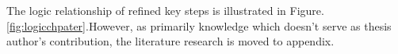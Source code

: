 The logic relationship of refined key steps is illustrated in Figure.\ref{fig:logicchpater}.However, as primarily knowledge which doesn't serve as thesis author's contribution, the literature research is moved to appendix.






